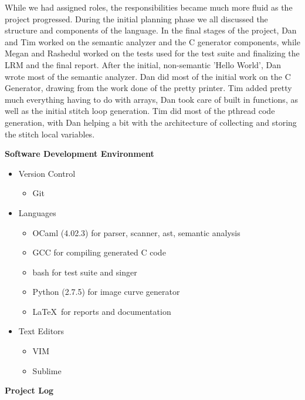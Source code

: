 \documentclass[11pt, oneside]{article}   	%
\begin{document}
While we had assigned roles, the responsibilities became much more fluid as the project progressed. During the initial planning phase we all discussed the structure and components of the language. In the final stages of the project, Dan and Tim worked on the semantic analyzer and the C generator components, while Megan and Rashedul worked on the tests used for the test suite and finalizing the LRM and the final report.  After the initial, non-semantic 'Hello World', Dan wrote most of the semantic analyzer.  Dan did most of the initial work on the C Generator, drawing from the work done of the pretty printer.  Tim added pretty much everything having to do with arrays, Dan took care of built in functions, as well as the initial stitch loop generation.  Tim did most of the pthread code generation, with Dan helping a bit with the architecture of collecting and storing the stitch local variables.

\newpage
\Large\textbf{Software Development Environment}\\[1em]
\normalsize
\begin{itemize}
  \item Version Control
  \begin{itemize}
    \item Git
  \end{itemize}
  \item Languages
  \begin{itemize}
    \item OCaml (4.02.3) for parser, scanner, ast, semantic analysis
    \item GCC for compiling generated C code
    \item bash for test suite and singer
    \item Python (2.7.5) for image curve generator
    \item \LaTeX\ for reports and documentation
  \end{itemize}
  \item Text Editors 
    \begin{itemize}
    \item VIM
    \item Sublime
    \end{itemize}
\end{itemize}

\newpage
\Large\textbf{Project Log}\\[1em]
\normalsize

\end{document}
